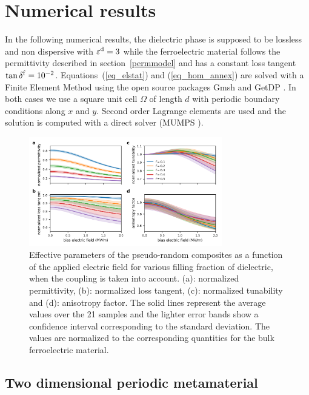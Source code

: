 \documentclass[%
 aip,
 amsmath,amssymb,
 reprint,%
]{revtex4-1}
\newcommand{\epsd}{\varepsilon^{\rm d}}
\newcommand{\co}[1]{#1}
\begin{document}
\section{Numerical results}
In the following numerical results, the dielectric phase is supposed to be
lossless and non dispersive with $\epsd = 3$ while the ferroelectric material follows the
permittivity described in section~\ref{permmodel} and has a constant loss
tangent $\tan \delta^{\rm f} = 10^{-2}$.
Equations~(\ref{eq_elstat}) and (\ref{eq_hom_annex}) are solved with a Finite Element
Method using the open source packages Gmsh \cite{geuzaine_gmsh_2009} and GetDP \cite{dular_general_1998}.
In both cases we use a square unit cell $\Omega$ of length $d$ with periodic boundary
conditions along $x$ and $y$. Second order Lagrange elements are used and the
solution is computed with a direct solver (MUMPS \cite{amestoy_fully_2001}).

\begin{figure}[!t]
 \centering
 \includegraphics[width=0.75\textwidth]{effpar_rand_cpl}
 \caption{Effective parameters of the pseudo-random composites as a function of the
  applied electric field for various filling fraction of dielectric, when the
  coupling is taken into account.
  (a): normalized permittivity, (b): normalized loss tangent, (c): normalized tunability and
  (d): anisotropy factor. The solid lines represent the average values
  over the 21 samples and the lighter error bands show a confidence interval corresponding to
  the standard deviation. \co{The values are normalized to the corresponding quantities for the bulk ferroelectric material.}}
 \label{eff_par_2Drand_TM}
\end{figure}
%


\subsection{Two dimensional periodic metamaterial}
\end{document}
